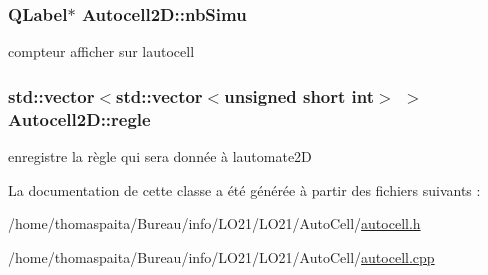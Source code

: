 \subsubsection[{\texorpdfstring{nb\+Simu}{nbSimu}}]{\setlength{\rightskip}{0pt plus 5cm}Q\+Label$\ast$ Autocell2\+D\+::nb\+Simu\hspace{0.3cm}{\ttfamily [protected]}}\hypertarget{class_autocell2_d_a77c628582ad0c795ec3d2e1733f2d53f}{}\label{class_autocell2_d_a77c628582ad0c795ec3d2e1733f2d53f}
compteur afficher sur l\textquotesingle{}autocell 
\subsubsection[{\texorpdfstring{regle}{regle}}]{\setlength{\rightskip}{0pt plus 5cm}std\+::vector$<$std\+::vector$<$unsigned short int$>$ $>$ Autocell2\+D\+::regle\hspace{0.3cm}{\ttfamily [protected]}}\hypertarget{class_autocell2_d_a238eef6674e510f6ce39d93427c6cad5}{}\label{class_autocell2_d_a238eef6674e510f6ce39d93427c6cad5}
enregistre la règle qui sera donnée à l\textquotesingle{}automate2D 

La documentation de cette classe a été générée à partir des fichiers suivants \+:\begin{DoxyCompactItemize}
\item 
/home/thomaspaita/\+Bureau/info/\+L\+O21/\+L\+O21/\+Auto\+Cell/\hyperlink{autocell_8h}{autocell.\+h}\item 
/home/thomaspaita/\+Bureau/info/\+L\+O21/\+L\+O21/\+Auto\+Cell/\hyperlink{autocell_8cpp}{autocell.\+cpp}\end{DoxyCompactItemize}
